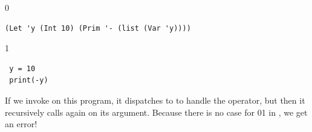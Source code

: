 \documentclass[7x10]{TimesAPriori_MIT}%
\def\racketEd{0}
\def\pythonEd{1}
\providecommand{\BookEdition}{1}
\let\edition\BookEdition
\newcommand{\racket}[1]{{\if\edition\racketEd{#1}\fi}}
\newcommand{\pythonColor}[0]{}
\newcommand{\python}[1]{{\if\edition\pythonEd\pythonColor #1\fi}}
\numberwithin{theorem}{chapter}
\numberwithin{definition}{chapter}
\numberwithin{equation}{chapter}
\begin{document}
{\if\edition\racketEd
\begin{lstlisting}
(Let 'y (Int 10) (Prim '- (list (Var 'y))))
\end{lstlisting}
\fi}
{\if\edition\pythonEd\pythonColor
\begin{minipage}{1.0\textwidth}
\begin{lstlisting}
 y = 10 
 print(-y)
\end{lstlisting}
\end{minipage}
\fi}

\noindent If we invoke  on this program, it
dispatches to  to handle the \code{-} operator, but
then it recursively calls  again on its argument.
Because there is no case for \racket{}\python{} in
, we get an error!
\end{document}
